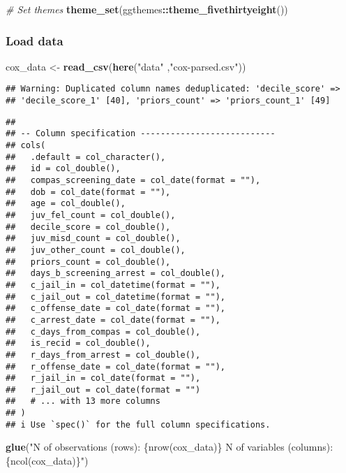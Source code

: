 \documentclass[
]{book}
\newenvironment{Shaded}{\begin{snugshade}}{\end{snugshade}}
\newcommand{\CommentTok}[1]{\textcolor[rgb]{0.56,0.35,0.01}{\textit{#1}}}
\newcommand{\KeywordTok}[1]{\textcolor[rgb]{0.13,0.29,0.53}{\textbf{#1}}}
\newcommand{\NormalTok}[1]{#1}
\newcommand{\OperatorTok}[1]{\textcolor[rgb]{0.81,0.36,0.00}{\textbf{#1}}}
\newcommand{\StringTok}[1]{\textcolor[rgb]{0.31,0.60,0.02}{#1}}
\begin{document}
\begin{Shaded}
\begin{Highlighting}[]
\CommentTok{\# Set themes }
\KeywordTok{theme\_set}\NormalTok{(ggthemes}\OperatorTok{::}\KeywordTok{theme\_fivethirtyeight}\NormalTok{())}
\end{Highlighting}
\end{Shaded}

\hypertarget{load-data-2}{%
\subsubsection{Load data}\label{load-data-2}}

\begin{Shaded}
\begin{Highlighting}[]
\NormalTok{cox\_data \textless{}{-}}\StringTok{ }\KeywordTok{read\_csv}\NormalTok{(}\KeywordTok{here}\NormalTok{(}\StringTok{"data"}\NormalTok{ ,}\StringTok{"cox{-}parsed.csv"}\NormalTok{))}
\end{Highlighting}
\end{Shaded}

\begin{verbatim}
## Warning: Duplicated column names deduplicated: 'decile_score' =>
## 'decile_score_1' [40], 'priors_count' => 'priors_count_1' [49]
\end{verbatim}

\begin{verbatim}
## 
## -- Column specification ---------------------------
## cols(
##   .default = col_character(),
##   id = col_double(),
##   compas_screening_date = col_date(format = ""),
##   dob = col_date(format = ""),
##   age = col_double(),
##   juv_fel_count = col_double(),
##   decile_score = col_double(),
##   juv_misd_count = col_double(),
##   juv_other_count = col_double(),
##   priors_count = col_double(),
##   days_b_screening_arrest = col_double(),
##   c_jail_in = col_datetime(format = ""),
##   c_jail_out = col_datetime(format = ""),
##   c_offense_date = col_date(format = ""),
##   c_arrest_date = col_date(format = ""),
##   c_days_from_compas = col_double(),
##   is_recid = col_double(),
##   r_days_from_arrest = col_double(),
##   r_offense_date = col_date(format = ""),
##   r_jail_in = col_date(format = ""),
##   r_jail_out = col_date(format = "")
##   # ... with 13 more columns
## )
## i Use `spec()` for the full column specifications.
\end{verbatim}

\begin{Shaded}
\begin{Highlighting}[]
\KeywordTok{glue}\NormalTok{(}\StringTok{"N of observations (rows): \{nrow(cox\_data)\}}
\StringTok{      N of variables (columns): \{ncol(cox\_data)\}"}\NormalTok{)}
\end{Highlighting}
\end{Shaded}
\end{document}
